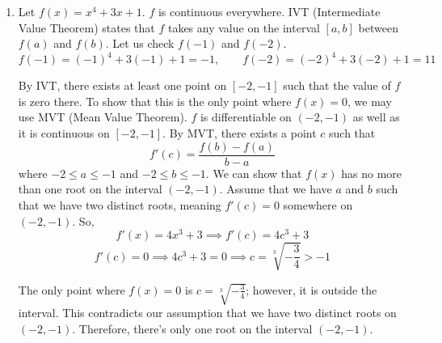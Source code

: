 \documentclass[a4paper, 12pt]{article}
\renewcommand{\headrulewidth}{0pt}
\renewcommand{\headrulewidth}{0pt}
\begin{document}
\begin{enumerate}[leftmargin=*,label=\textbf{\arabic*.}]
\newpage

\item Let $f(x) = x^4 +3x+1$. $f$ is continuous everywhere. IVT (Intermediate Value Theorem) states that $f$ takes any value on the interval $[a, b]$ between $f(a)$ and $f(b)$. Let us check $f(-1)$ and $f(-2)$.
\[ f(-1) = (-1)^4 + 3(-1) + 1 = -1,\qquad f(-2) = (-2)^4 + 3(-2) + 1 = 11\]

By IVT, there exists at least one point on $[-2, -1]$ such that the value of $f$ is zero there. To show that this is the only point where $f(x) = 0$, we may use MVT (Mean Value Theorem). $f$ is differentiable on $(-2, -1)$ as well as it is continuous on $[-2, -1]$. By MVT, there exists a point $c$ such that
\[f'(c)=\frac{f(b)-f(a)}{b-a}\]
where $-2\leq a \leq-1$ and $-2\leq b\leq-1$. We can show that $f(x)$ has no more than one root on the interval $(-2, -1)$. Assume that we have $a$ and $b$ such that we have two distinct roots, meaning $f'(c) = 0$ somewhere on $(-2, -1)$. So,
\[f'(x)=4x^3+3\implies f'(c)=4c^3+3\]
\[f'(c)=0\implies4c^3+3=0\implies c=\sqrt[3]{-\frac{3}{4}}>-1\]

The only point where $f(x)=0$ is $c=\sqrt[3]{-\frac{3}{4}}$; however, it is outside the interval. This contradicts our assumption that we have two distinct roots on $(-2, -1)$. Therefore, there's only one root on the interval $(-2,-1)$.

\end{enumerate}

\newpage
{}
{}

\newpage
\pagestyle{fancy}
\renewcommand{\headrulewidth}{1pt}

\end{document}
